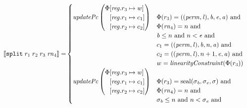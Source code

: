 \documentclass[a3paper]{article}
\newcommand{\sem}[1]{\left\llbracket #1 \right\rrbracket}
\newcommand{\tand}{\text{ and }}
\newcommand{\targetcolor}[1]{\color{black}}
\newcommand{\trg}[1]{{\targetcolor{} #1}}
\newcommand{\zinstr}[1]{\texttt{#1}}
\newcommand{\fourinstr}[5]{
  \ifthenelse{\equal{#2#3#4#5}{}}
  {\zinstr{#1}}
  {\zinstr{#1} \; #2 \; #3 \; #4 \; #5}
}
\newcommand{\tsplit}[4]{\fourinstr{\trg{split}}{#1}{#2}{#3}{#4}}
\newcommand{\update}[2]{[#1 \mapsto #2]}
\newcommand{\updReg}[2]{\update{\reg.#1}{#2}}
\newcommand{\shareddom}[1]{\mathrm{#1}}
\newcommand{\perm}{\var{perm}}
\newcommand{\lin}{\var{l}}
\newcommand{\seal}[1]{\shareddom{seal}(#1)}
\newcommand{\var}[1]{\mathit{#1}}
\newcommand{\rn}{\var{rn}}
\newcommand{\reg}{\var{reg}}
\newcommand{\baddr}{\var{b}}
\newcommand{\eaddr}{\var{e}}
\newcommand{\aaddr}{\var{a}}
\newcommand{\plainfun}[2]{
  \ifthenelse{\equal{#2}{}}
  {\mathit{#1}}
  {\mathit{#1}(#2)}
}
\newcommand{\linCons}[1]{\plainfun{linearityConstraint}{#1}}
\newcommand{\updPcAddr}[1]{\plainfun{updatePc}{#1}}
\begin{document}
\begin{align*}
  \sem{\tsplit{r_1}{r_2}{r_3}{\rn_4}} = &
                               \begin{cases}
                                 \updPcAddr{}\left(
                                   \arraycolsep=0pt
                                   \begin{array}{rl}
                                     \Phi&\updReg{r_3}{w}\\
                                         &\updReg{r_1}{c_1}\\
                                         &\updReg{r_2}{c_2}
                                   \end{array}\right)
&
                                 \arraycolsep=0pt
                                 \begin{array}[t]{l}
                                   \Phi(r_3) = ((\perm,\lin),\baddr,\eaddr,\aaddr) \tand \\
                                   \Phi(\rn_4) = n \tand\\
                                   \baddr \leq n \tand n < \eaddr \tand \\
                                   c_1 = ((\perm,\lin),\baddr,n,\aaddr) \tand \\
                                   c_2 = ((\perm,\lin),n+1,\eaddr,\aaddr) \tand \\
                                   w = \linCons{\Phi(r_3)}
                                 \end{array}\\
                                 \updPcAddr{} \left(
                                 \arraycolsep=0pt
                                 \begin{array}{rl}
                                   \Phi&\updReg{r_3}{w}\\
                                       &\updReg{r_1}{c_1}\\
                                       &\updReg{r_2}{c_2}
                                 \end{array} \right)
&
                                 \arraycolsep=0pt
                                 \begin{array}[t]{l}
                                   \Phi(r_3) = \seal{\sigma_\baddr,\sigma_\eaddr,\sigma} \tand \\
                                   \Phi(\rn_4) = n \tand\\
                                   \sigma_\baddr \leq n \tand n < \sigma_\eaddr \tand \\

\end{array}
\end{cases}
\end{align*}
\end{document}

